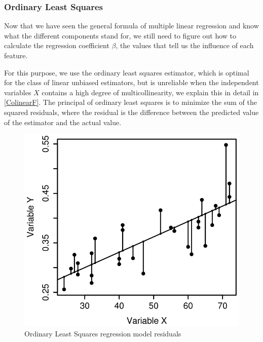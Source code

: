 \subsubsection{Ordinary Least Squares}\label{ch:OLS}
Now that we have seen the general formula of multiple linear regression and know what the different components stand for, we still need to figure out 
how to calculate the regression coefficient $\beta$, the values that tell us the influence of each feature. 

For this purpose, we use the ordinary least squares estimator, which is optimal for the class of linear unbiased estimators, 
but is unreliable when the independent variables $X$ contains a high degree of multicollinearity, we explain this in detail in \autoref{ColinearF}.
The principal of ordinary least squares is to minimize the sum of the squared residuals, where the residual is the difference between
the predicted value of the estimator and the actual value. \cite{Linear-Regression}


\begin{figure}[H]
    \centering
    \includegraphics[scale=0.3]{gfx/OLS.png}
    \caption[Ordinary Least Squares regression model residuals]
    {Ordinary Least Squares regression model residuals
    \footnotemark}
    \label{fig:OLS}
\end{figure}

